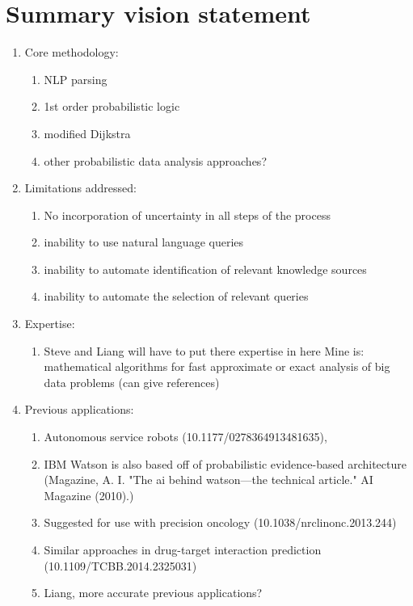 \documentclass[11pt,notitlepage]{article}
\begin{document}
\section{Summary vision statement}
\begin{enumerate}
 \item Core methodology:
        \begin{enumerate}
        \item  NLP parsing
        \item  1st order probabilistic logic
        \item modified Dijkstra
        \item other probabilistic data analysis approaches?
  		\end{enumerate}
 \item Limitations addressed:
        \begin{enumerate}
        \item No incorporation of uncertainty in all steps of the process
        \item inability to use natural language queries
        \item inability to automate identification of relevant knowledge sources
        \item inability to automate the selection of relevant queries
        \end{enumerate}
 \item Expertise:
 		\begin{enumerate}
        \item Steve and Liang will have to put there expertise in here
        Mine is: mathematical algorithms for fast approximate or exact analysis of big data problems (can give references)
        \end{enumerate}
 \item Previous applications:
 		\begin{enumerate}
        \item Autonomous service robots (10.1177/0278364913481635),
        \item IBM Watson is also based off of probabilistic evidence-based architecture (Magazine, A. I. "The ai behind watson—the technical article." AI Magazine (2010).)
        \item Suggested for use with precision oncology (10.1038/nrclinonc.2013.244)
        \item Similar approaches in drug-target interaction prediction (10.1109/TCBB.2014.2325031)
        \item Liang, more accurate previous applications?
        \end{enumerate}
\end{enumerate}
\end{document}
